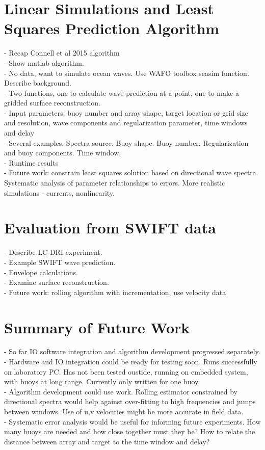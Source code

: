 \documentclass[11pt]{amsart}
\begin{document}
\section{Linear Simulations and Least Squares Prediction Algorithm}
- Recap Connell et al 2015 algorithm\\
- Show matlab algorithm.\\
- No data, want to simulate ocean waves.  Use WAFO toolbox seasim function.  Describe background.\\
- Two functions, one to calculate wave prediction at a point, one to make a gridded surface reconstruction.\\
- Input parameters: buoy number and array shape, target location or grid size and resolution, wave components and regularization parameter, time windows and delay\\
- Several examples.  Spectra source.  Buoy shape.  Buoy number.  Regularization and buoy components.  Time window.\\
- Runtime results\\
- Future work: constrain least squares solution based on directional wave spectra.  Systematic analysis of parameter relationships to errors.  More realistic simulations - currents, nonlinearity. \\

\section{Evaluation from SWIFT data}
- Describe LC-DRI experiment.\\
- Example SWIFT wave prediction.\\
- Envelope calculations.\\
- Examine surface reconstruction.\\
- Future work: rolling algorithm with incrementation, use velocity data\\

\section{Summary of Future Work}
- So far IO software integration and algorithm development progressed separately.  \\
- Hardware and IO integration could be ready for testing soon. Runs successfully on laboratory PC.  Has not been tested oustide, running on embedded system, with buoys at long range.  Currently only written for one buoy.  \\
- Algorithm development could use work.  Rolling estimator constrained by directional spectra would help against over-fitting to high frequencies and jumps between windows. Use of u,v velocities might be more accurate in field data. \\ 
- Systematic error analysis would be useful for informing future experiments.  How many buoys are needed and how close together must they be?   How to relate the distance between array and target to the time window and delay?
\end{document}
